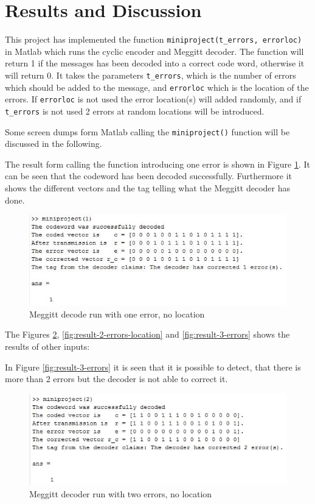 \documentclass[Main]{subfiles}
\begin{document}
\section{Results and Discussion}
This project has implemented the function \texttt{miniproject(t\_errors, errorloc)} in Matlab which runs the cyclic encoder and Meggitt decoder.
The function will return 1 if the messages has been decoded into a correct code word, otherwise it will return 0.
It takes the parameters \texttt{t\_errors}, which is the number of errors which should be added to the message, and \texttt{errorloc} which is the location of the errors.
If \texttt{errorloc} is not used the error location(s) will added randomly, and if \texttt{t\_errors} is not used 2 errors at random locations will be introduced. 

Some screen dumps form Matlab calling the \texttt{miniproject()} function will be discussed in the following.

The result form calling the function introducing one error is shown in Figure \ref{fig:result-1-errors}.
It can be seen that the codeword has been decoded successfully.
Furthermore it shows the different vectors and the tag telling what the Meggitt decoder has done. 

\begin{figure}[h!]
\centering
\includegraphics[width=0.7\linewidth]{./Picture/result-1-errors}
\caption{Meggitt decode run with one error, no location}
\label{fig:result-1-errors}
\end{figure}

The Figures \ref{fig:result-2-errors}, \ref{fig:result-2-errors-location} and \ref{fig:result-3-errors} shows the results of other inputs:

In Figure \ref{fig:result-3-errors} it is seen that it is possible to detect, that there is more than 2 errors but the decoder is not able to correct it. 

\begin{figure}[h!]
\centering
\includegraphics[width=0.7\linewidth]{./Picture/result-2-errors}
\caption{Meggitt decoder run with two errors, no location}
\label{fig:result-2-errors}
\end{figure}
\end{document}

